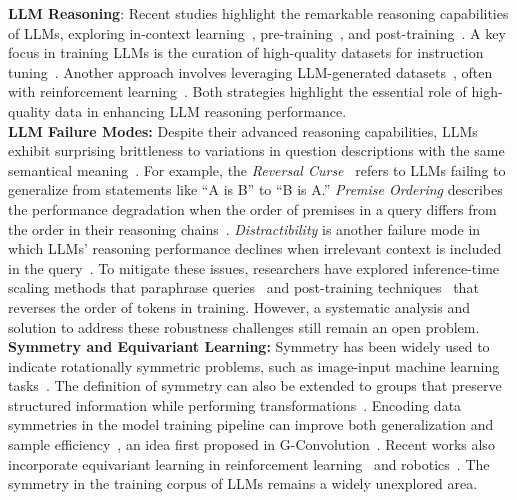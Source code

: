 \textbf{LLM Reasoning}: Recent studies highlight the remarkable reasoning capabilities of LLMs, exploring in-context learning~\citep{wei2022chain, yao2022react}, pre-training~\citep{YXLA2024-gsm1, YXLA2024-gsm2, shao2024deepseekmath, lightman2023let, lin2024not}, and post-training~\citep{ni2024exploring}. A key focus in training LLMs is the curation of high-quality datasets for instruction tuning~\citep{yue2023mammoth, liu2024augmenting, ni2024exploring}. Another approach involves leveraging LLM-generated datasets~\citep{wang2024math, cen2024bridging}, often with reinforcement learning~\citep{ouyang2022training, kumar2024training}. Both strategies highlight the essential role of high-quality data in enhancing LLM reasoning performance.
\\
\textbf{LLM Failure Modes:} Despite their advanced reasoning capabilities, LLMs exhibit surprising brittleness to variations in question descriptions with the same semantical meaning~\citep{chen2024premise}. For example, the \textit{Reversal Curse}~\citep{berglund2023reversal} refers to LLMs failing to generalize from statements like ``A is B'' to ``B is A.'' \textit{Premise Ordering} describes the performance degradation when the order of premises in a query differs from the order in their reasoning chains~\citep{chen2024premise}. \textit{Distractibility} is another failure mode in which LLMs' reasoning performance declines when irrelevant context is included in the query~\citep{shi2023large}. To mitigate these issues, researchers have explored inference-time scaling methods that paraphrase queries~\citep{zhou2024paraphrase} and post-training techniques~\citep{golovneva2024reverse} that reverses the order of tokens in training. However, a systematic analysis and solution to address these robustness challenges still remain an open problem.
\\
\textbf{Symmetry and Equivariant Learning:} Symmetry has been widely used to indicate rotationally
symmetric problems, such as image-input machine learning tasks~\citep{weiler2019general}. The definition of symmetry can also be extended to groups that preserve structured information while performing transformations~\citep{muglich2022equivariant}. Encoding data symmetries in the model training pipeline can improve both generalization and sample efficiency~\citep{wang2022mathrm}, an idea first proposed in G-Convolution~\citep{cohen2016group}. Recent works also incorporate equivariant learning in reinforcement learning~\citep{liu2023continual, wang2022mathrm} and robotics~\citep{yang2024equibot}. The symmetry in the training corpus of LLMs remains a widely unexplored area.
